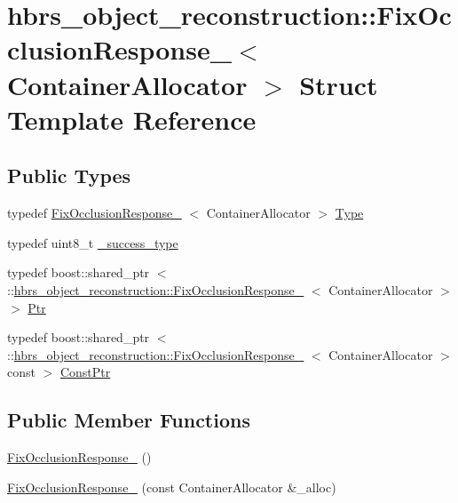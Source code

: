 \hypertarget{structhbrs__object__reconstruction_1_1_fix_occlusion_response__}{\section{hbrs\-\_\-object\-\_\-reconstruction\-:\-:\-Fix\-Occlusion\-Response\-\_\-$<$ \-Container\-Allocator $>$ \-Struct \-Template \-Reference}
\label{structhbrs__object__reconstruction_1_1_fix_occlusion_response__}
}
\subsection*{\-Public \-Types}
\begin{DoxyCompactItemize}
\item 
typedef \hyperlink{structhbrs__object__reconstruction_1_1_fix_occlusion_response__}{\-Fix\-Occlusion\-Response\-\_\-}\*
$<$ \-Container\-Allocator $>$ \hyperlink{structhbrs__object__reconstruction_1_1_fix_occlusion_response___ae5d34c9f3e91b8ac17f7fe21d83977f3}{\-Type}
\item 
typedef uint8\-\_\-t \hyperlink{structhbrs__object__reconstruction_1_1_fix_occlusion_response___ac3adc7cebc9c1913ef0b8ca295e93e7e}{\-\_\-success\-\_\-type}
\item 
typedef boost\-::shared\-\_\-ptr\*
$<$ \-::\hyperlink{structhbrs__object__reconstruction_1_1_fix_occlusion_response__}{hbrs\-\_\-object\-\_\-reconstruction\-::\-Fix\-Occlusion\-Response\-\_\-}\*
$<$ \-Container\-Allocator $>$ $>$ \hyperlink{structhbrs__object__reconstruction_1_1_fix_occlusion_response___a8b61bcbad4a9d42ae28c679407fa1133}{\-Ptr}
\item 
typedef boost\-::shared\-\_\-ptr\*
$<$ \-::\hyperlink{structhbrs__object__reconstruction_1_1_fix_occlusion_response__}{hbrs\-\_\-object\-\_\-reconstruction\-::\-Fix\-Occlusion\-Response\-\_\-}\*
$<$ \-Container\-Allocator $>$ const  $>$ \hyperlink{structhbrs__object__reconstruction_1_1_fix_occlusion_response___a6446934e37dce2b75e4cf2a64631631c}{\-Const\-Ptr}
\end{DoxyCompactItemize}
\subsection*{\-Public \-Member \-Functions}
\begin{DoxyCompactItemize}
\item 
\hyperlink{structhbrs__object__reconstruction_1_1_fix_occlusion_response___a4624b54890f5e2bc9e446ff60efa67ba}{\-Fix\-Occlusion\-Response\-\_\-} ()
\item 
\hyperlink{structhbrs__object__reconstruction_1_1_fix_occlusion_response___a0754faad761ccbaa0444a52d8f4f390e}{\-Fix\-Occlusion\-Response\-\_\-} (const \-Container\-Allocator \&\-\_\-alloc)
\end{DoxyCompactItemize}
